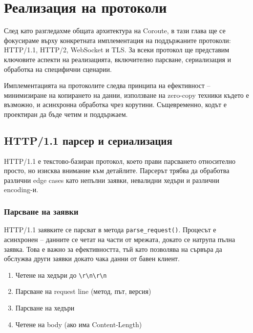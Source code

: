 \section{Реализация на протоколи}
\label{sec:protocols}

След като разгледахме общата архитектура на Coroute, в тази глава ще се фокусираме върху конкретната имплементация на поддържаните протоколи: HTTP/1.1, HTTP/2, WebSocket и TLS. За всеки протокол ще представим ключовите аспекти на реализацията, включително парсване, сериализация и обработка на специфични сценарии.

Имплементацията на протоколите следва принципа на ефективност -- минимизиране на копирането на данни, използване на zero-copy техники където е възможно, и асинхронна обработка чрез корутини. Същевременно, кодът е проектиран да бъде четим и поддържаем.

\subsection{HTTP/1.1 парсер и сериализация}

HTTP/1.1 е текстово-базиран протокол, което прави парсването относително просто, но изисква внимание към детайлите. Парсерът трябва да обработва различни edge cases като непълни заявки, невалидни хедъри и различни encoding-и.

\subsubsection{Парсване на заявки}

HTTP/1.1 заявките се парсват в метода \texttt{parse\_request()}. Процесът е асинхронен -- данните се четат на части от мрежата, докато се натрупа пълна заявка. Това е важно за ефективността, тъй като позволява на сървъра да обслужва други заявки докато чака данни от бавен клиент.

\begin{enumerate}
    \item Четене на хедъри до \texttt{\textbackslash r\textbackslash n\textbackslash r\textbackslash n}
    \item Парсване на request line (метод, път, версия)
    \item Парсване на хедъри
    \item Четене на body (ако има Content-Length)
\end{enumerate}

